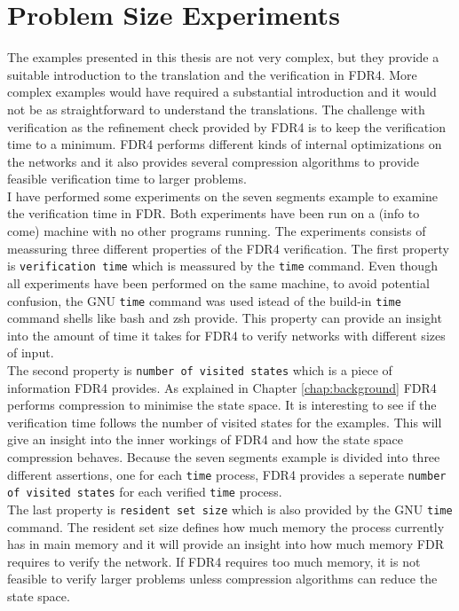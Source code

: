 \section{Problem Size Experiments}
The examples presented in this thesis are not very complex, but they provide a suitable introduction to the translation and the verification in FDR4. More complex examples would have required a substantial introduction and it would not be as straightforward to understand the translations. The challenge with verification as the refinement check provided by FDR4 is to keep the verification time to a minimum. FDR4 performs different kinds of internal optimizations on the networks and it also provides several compression algorithms to provide feasible verification time to larger problems. \\

I have performed some experiments on the seven segments example to examine the verification time in FDR.
Both experiments have been run on a (info to come) machine with no other programs running. The experiments consists of meassuring three different properties of the FDR4 verification. The first property is \texttt{verification time} which is meassured by the \texttt{time} command. Even though all experiments have been performed on the same machine, to avoid potential confusion, the GNU \texttt{time} command was used istead of the build-in \texttt{time} command shells like bash and zsh provide. This property can provide an insight into the amount of time it takes for FDR4 to verify \cspm{} networks with different sizes of input.\\

The second property is \texttt{number of visited states} which is a piece of information FDR4 provides.
As explained in Chapter \ref{chap:background} FDR4 performs compression to minimise the state space. It is interesting to see if the verification time follows the number of visited states for the examples. This will give an insight into the inner workings of FDR4 and how the state space compression behaves.
Because the seven segments example is divided into three different assertions, one for each \texttt{time} process, FDR4 provides a seperate \texttt{number of visited states} for each verified \texttt{time} process. \\

The last property is \texttt{resident set size} which is also provided by the GNU \texttt{time} command. The resident set size defines how much memory the process currently has in main memory and it will provide an insight into how much memory FDR requires to verify the network. If FDR4 requires too much memory, it is not feasible to verify larger problems unless compression algorithms can reduce the state space. \\

